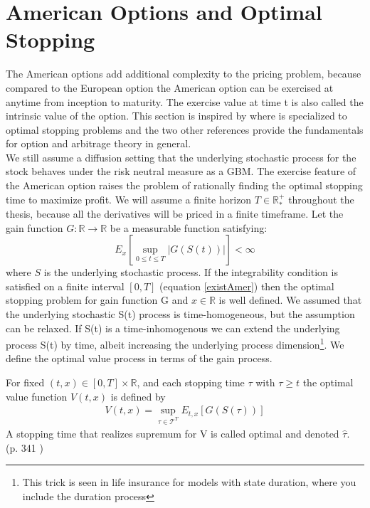 
\section{American Options and Optimal Stopping}\label{AmericanOptions}
The American options add additional complexity to the pricing problem, because compared to the European option the American option can be exercised at anytime from inception to maturity. The exercise value at time t is also called the intrinsic value of the option. This section is inspired by \parencite{finKont, Shiryaev06,Elliott99} where \parencite{Shiryaev06} is specialized to optimal stopping problems and the two other references provide the fundamentals for option and arbitrage theory in general.\\

We still assume a diffusion setting that the underlying stochastic process for the stock behaves under the risk neutral measure as a GBM. The exercise feature of the American option raises the problem of rationally finding the optimal stopping time to maximize profit. We will assume a finite horizon $T\in \mathbb{R}_*^+$ throughout the thesis, because all the derivatives will be priced in a finite timeframe. Let the gain function $G:\mathbb{R}\to \mathbb{R}$ be a measurable function satisfying:
\begin{equation}\label{existAmer}
E_{x}[\sup_{0\leq t \leq T}|G(S(t))|] < \infty
\end{equation}
where $S$ is the underlying stochastic process. If the integrability condition is satisfied on a finite interval $[0,T]$ (equation \eqref{existAmer}) then the optimal stopping problem for gain function G and $x \in \mathbb{R}$ is well defined. We assumed that the underlying stochastic S(t) process is time-homogeneous, but the assumption can be relaxed. If S(t) is a time-inhomogenous we can extend the underlying process S(t) by time, albeit increasing the underlying process dimension\footnote{This trick is seen in life insurance for models with state duration, where you include the duration process}. We define the optimal value process in terms of the gain process.

\theoremstyle{definition}
\begin{definition}{}\label{optValFunc}
For fixed $(t,x)\in [0,T] \times \mathbb{R}$, and each stopping time $\tau$ with $\tau\geq t$ the optimal value function $V(t,x)$ is defined by
\begin{align}
V(t,x)= \sup_{\tau \in \mathcal{T}^T} E_{t,x}[G(S(\tau))]
\end{align}
A stopping time that realizes supremum for V is called optimal and denoted $\hat{\tau}$.
\\ \null \hfill (p. 341 \parencite{finKont})
\end{definition}

